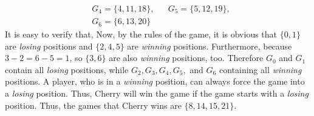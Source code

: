 \begin{multicols}{2}
\begin{align*}
		& G_4=\{4,11,18\},&&G_5=\{5,12,19\},\\
		& G_6=\{6,13,20\}
	\end{align*}
	It is easy to verify that,
	\vskip 0.2cm
	\vskip 0.2cm
	Now, by the rules of the game, it is obvious that $\{0, 1\}$ are \textit{losing} positions and $\{2,4,5\}$ are \textit{winning} positions.
	Furthermore, because $3-2=6-5=1$, so $\{3,6\}$ are also \textit{winning} positions, too.
	\vskip 0.1cm
	Therefore $G_0$ and $G_1$ contain all \textit{losing} positions, while $G_2,G_3,G_4,G_5,$ and $G_6$ containing all \textit{winning} positions.
	A player, who is in a \textit{winning} position, can always force the game into a \textit{losing} position.
	Thus, Cherry will win the game if the game starts with a \textit{losing} position.
	Thus, the games that Cherry wins are $\{8,14,15,21\}$.
\end{multicols}